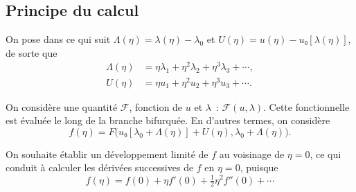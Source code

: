 \documentclass[12pt, final]{amsart}
\begin{document}
\subsection{Principe du calcul}

On pose dans ce qui suit \(\Lambda(\eta)=\lambda(\eta)-\lambda_0\) et
\(U(\eta)=u(\eta)-u₀[\lambda(\eta)]\), de sorte que
\begin{align}
  \label{eq:20211112155446}
  \Lambda(\eta)&=\eta\lambda_1+\eta^2\lambda_2+\eta^3\lambda_3+\cdots,\\
  \label{eq:20211112113028}
  U(\eta)&=\eta u_1+\eta^2 u_2+\eta^3u_3+\cdots.
\end{align}

On considère une quantité \(\mathcal F\), fonction de \(u\) et \(\lambda\)~:
\(\mathcal F(u, \lambda)\). Cette fonctionnelle est évaluée le long de la
branche bifurquée. En d'autres termes, on considère
\begin{equation}
  f(\eta)=F\bigl(u₀[\lambda_0+\Lambda(\eta)]+U(\eta),
  \lambda_0+\Lambda(\eta)\bigr).
\end{equation}

On souhaite établir un développement limité de \(f\) au voisinage de
\(\eta=0\), ce qui conduit à calculer les dérivées successives de \(f\) en
\(\eta=0\), puisque
\begin{equation}
  f(\eta)=f(0)+\eta f'(0)+\tfrac12\eta^2f''(0)+\cdots
\end{equation}
\end{document}
